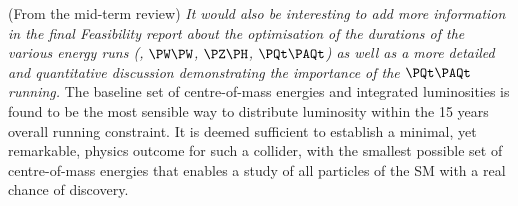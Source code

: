 \begin{tcolorbox}[colback=blue!5!white,
                  colframe=blue!75!black,
                  title=Rationale for the operation model 
                 ]
\footnotesize (From the mid-term review) 
{\it It would also be interesting to add more information in the final Feasibility report about the optimisation of the durations of the various energy runs (\PZ, $\PW\PW$, $\PZ\PH$, $\PQt\PAQt$) as well as a more detailed and quantitative discussion demonstrating the importance of the $\PQt\PAQt$ running.}
\tcblower
\footnotesize The baseline set of centre-of-mass energies and integrated luminosities is found to be the most sensible way to distribute luminosity within the 15 years overall running constraint. 
It is deemed sufficient to establish a minimal, yet remarkable, physics outcome for such a collider, with the smallest possible set of centre-of-mass energies that enables a study of all particles of the SM with a real chance of discovery. 


\end{tcolorbox}
